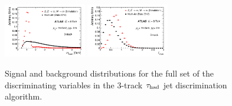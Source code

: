 \begin{figure}[tp]
  \includegraphics[width=0.32\textwidth]{figures/PERF-2013-06/figaux_12}
  \includegraphics[width=0.32\textwidth]{figures/PERF-2013-06/figaux_13}
  \caption{Signal and background distributions for the full set of the discriminating variables in the 3-track $\tau_\text{had}$ jet discrimination algorithm.}
  \label{fig:tauid-inputs-3p}
\end{figure}

\clearpage


